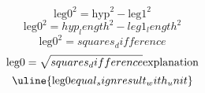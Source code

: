 \[\text{{{leg0}}}^{{2}}=\text{{{hyp}}}^{{2}}-\text{{{leg1}}}^{{2}}\]
\[\text{{{leg0}}}^{{2}}={hyp_length}^{{2}}-{leg1_length}^{{2}}\]
\[\text{{{leg0}}}^{{2}}={squares_difference}\]
\[\text{{{leg0}}}=\sqrt{{\mathstrut {squares_difference}}}\text{{{explanation}}}\]
\[\uline{{\text{{{leg0}}}{equal_sign}{result_with_unit}}}\]